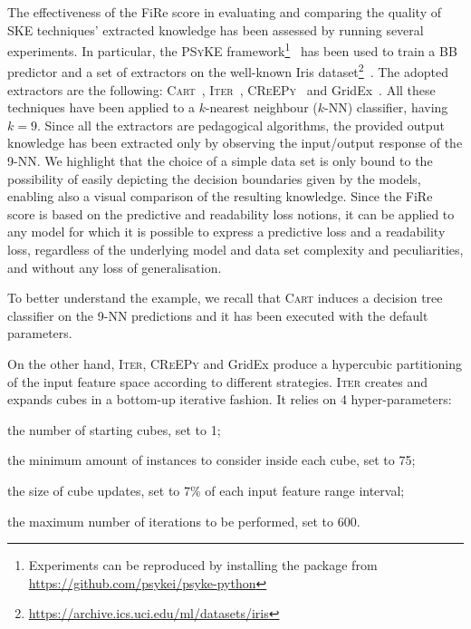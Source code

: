 \documentclass{article}
\newcommand{\psyke}{\textsc{PSyKE}}
\newcommand{\iter}{\textsc{Iter}}
\newcommand{\gridex}{GridEx}
\newcommand{\creepy}{\textsc{CReEPy}}
\newcommand{\cart}{\textsc{Cart}}
\newcommand{\fire}{FiRe}
\newenvironment{inlinelist}{\begin{enumerate*}[label=\emph{(\roman{*})}]}{\end{enumerate*}}
\begin{document}
The effectiveness of the \fire{} score in evaluating and comparing the quality of SKE techniques' extracted knowledge has been assessed by running several experiments.%
%
In particular, the \psyke{} framework\footnote{Experiments can be reproduced by installing the package from \url{https://github.com/psykei/psyke-python}}~\cite{psyke-woa2021,psyke-extraamas2022,psyke-ia2022} has been used to train a BB predictor and a set of extractors on the well-known Iris dataset\footnote{\url{https://archive.ics.uci.edu/ml/datasets/iris}}~\cite{iris}.
%
The adopted extractors are the following: \cart{}~\cite{breiman1984classification}, \iter{}~\cite{huysmans2006iter}, \creepy{}~\cite{psyke-woa2021} and \gridex{}~\cite{gridex-extraamas2021}.
%
All these techniques have been applied to a $k$-nearest neighbour ($k$-NN) classifier, having $k=9$.
%
Since all the extractors are pedagogical algorithms, the provided output knowledge has been extracted only by observing the input/output response of the 9-NN.
%
We highlight that the choice of a simple data set is only bound to the possibility of easily depicting the decision boundaries given by the models, enabling also a visual comparison of the resulting knowledge.
%
Since the \fire{} score is based on the predictive and readability loss notions, it can be applied to any model for which it is possible to express a predictive loss and a readability loss, regardless of the underlying model and data set complexity and peculiarities, and without any loss of generalisation.

To better understand the example, we recall that \cart{} induces a decision tree classifier on the 9-NN predictions and it has been executed with the default parameters.

On the other hand, \iter{}, \creepy{} and \gridex{} produce a hypercubic partitioning of the input feature space according to different strategies.
%
\iter{} creates and expands cubes in a bottom-up iterative fashion.
%
It relies on 4 hyper-parameters:
%
\begin{inlinelist}
	\item the number of starting cubes, set to 1;
	\item the minimum amount of instances to consider inside each cube, set to 75;
	\item the size of cube updates, set to 7\% of each input feature range interval;
	\item the maximum number of iterations to be performed, set to 600.
\end{inlinelist}
\end{document}
